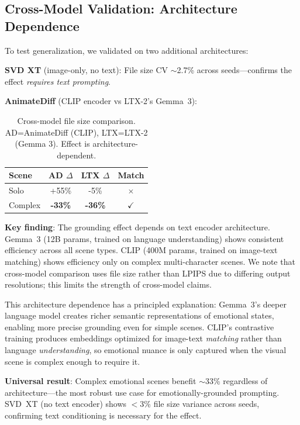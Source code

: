\documentclass[10pt,twocolumn,letterpaper]{article}
\begin{document}
\subsection{Cross-Model Validation: Architecture Dependence}

To test generalization, we validated on two additional architectures:

\textbf{SVD XT} (image-only, no text): File size CV $\sim$2.7\% across seeds---confirms the effect \textit{requires text prompting}.

\textbf{AnimateDiff} (CLIP encoder vs LTX-2's Gemma~3):

\begin{table}[t]
\centering
\small
\begin{tabular}{lccc}
\toprule
\textbf{Scene} & \textbf{AD $\Delta$} & \textbf{LTX $\Delta$} & \textbf{Match} \\
\midrule
Solo & +55\% & -5\% & $\times$ \\
Complex & \textbf{-33\%} & \textbf{-36\%} & $\checkmark$ \\
\bottomrule
\end{tabular}
\caption{Cross-model file size comparison. AD=AnimateDiff (CLIP), LTX=LTX-2 (Gemma 3). Effect is architecture-dependent.}
\end{table}

\textbf{Key finding}: The grounding effect depends on text encoder architecture. Gemma~3 (12B params, trained on language understanding) shows consistent efficiency across all scene types. CLIP (400M params, trained on image-text matching) shows efficiency only on complex multi-character scenes. We note that cross-model comparison uses file size rather than LPIPS due to differing output resolutions; this limits the strength of cross-model claims.

This architecture dependence has a principled explanation: Gemma~3's deeper language model creates richer semantic representations of emotional states, enabling more precise grounding even for simple scenes. CLIP's contrastive training produces embeddings optimized for image-text \textit{matching} rather than language \textit{understanding}, so emotional nuance is only captured when the visual scene is complex enough to require it.

\textbf{Universal result}: Complex emotional scenes benefit $\sim$33\% regardless of architecture---the most robust use case for emotionally-grounded prompting. SVD~XT (no text encoder) shows $<$3\% file size variance across seeds, confirming text conditioning is necessary for the effect.
\end{document}
